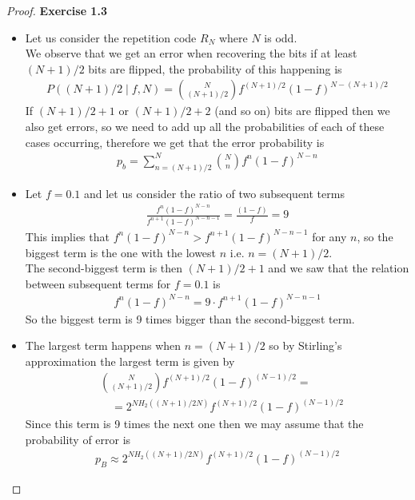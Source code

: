 \documentclass[11pt]{article}
\theoremstyle{definition}
\begin{document}
\cleardoublepage
\begin{proof}{\textbf{Exercise 1.3}}
\begin{itemize}
\item [(a)] Let us consider the repetition code $R_N$ where $N$ is odd.\\
We observe that we get an error when recovering the bits if at least
$(N + 1)/2$ bits are flipped, the probability of this happening is
\begin{align*}
    P((N+1)/2 \mid f, N) = \binom{N}{(N+1)/2}f^{(N+1)/2}(1 - f)^{N - (N + 1)/2}
\end{align*}
If $(N + 1)/2 + 1$ or $(N + 1)/2 + 2$ (and so on) bits are flipped then we
also get errors, so we need to add up all the probabilities of each of these cases
occurring, therefore we get that the error probability is
\begin{align*}
    p_b = \sum_{n = (N + 1)/2}^N \binom{N}{n}f^{n}(1 - f)^{N - n}
\end{align*}
\item [(b)] Let $f = 0.1$ and let us consider the ratio of two subsequent terms
\begin{align*}
    \frac{f^n (1 - f)^{N - n}}{f^{n + 1} (1 - f)^{N - n - 1}}
    = \frac{(1 - f)}{f} = 9
\end{align*}
This implies that $f^n (1 - f)^{N - n} > f^{n + 1} (1 - f)^{N - n - 1}$ for any
$n$, so the biggest term is the one with the lowest $n$ i.e. $n = (N + 1)/2$.\\
The second-biggest term is then $(N + 1)/2 + 1$ and we saw that the relation
between subsequent terms for $f = 0.1$ is
\begin{align*}
    f^n (1 - f)^{N - n} = 9 \cdot f^{n + 1} (1 - f)^{N - n - 1}
\end{align*}
So the biggest term is 9 times bigger than the second-biggest term.
\item [(c)] The largest term happens when $n = (N + 1)/2$ so by Stirling's
approximation the largest term is given by
\begin{align*}
    &\binom{N}{(N+1)/2}f^{(N +1)/2}(1 - f)^{(N - 1)/2} = \\
    &\quad= 2^{N H_2((N + 1)/2N)}f^{(N +1)/2}(1 - f)^{(N - 1)/2}
\end{align*}
Since this term is 9 times the next one then we may assume that the probability
of error is
\begin{align*}
    p_B \approx 2^{N H_2((N + 1)/2N)}f^{(N +1)/2}(1 - f)^{(N - 1)/2}
\end{align*}


\end{itemize}
\end{proof}
\end{document}
